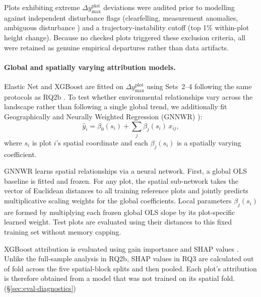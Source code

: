 \documentclass[11pt,a4paper]{report}
\begin{document}
Plots exhibiting extreme $\Delta y_{\max}^{\text{plot}}$ deviations were audited prior to modelling against independent disturbance flags (clearfelling, measurement anomalies, ambiguous disturbance ) and a trajectory-instability cutoff (top 1\% within-plot height change). Because no checked plots triggered these exclusion criteria, all were retained as genuine empirical departures rather than data artifacts.

\paragraph*{Global and spatially varying attribution models.}
Elastic Net and XGBoost are fitted on $\Delta y_{\max}^{\text{plot}}$ using Sets~2--4 following the same protocols as RQ2b \cite{zou2005Regularization_C4_NN, chen2016XGBoost_C4_NN}. To test whether environmental relationships vary across the landscape rather than following a single global trend, we additionally fit Geographically and Neurally Weighted Regression (GNNWR) \cite{du2020Geographically_C6_GWR}):
\begin{equation}
\hat{y}_i = \beta_0(s_i) + \sum_j \beta_j(s_i)\,x_{ij},
\label{eq:gnnwr}
\end{equation}
where $s_i$ is plot $i$'s spatial coordinate and each $\beta_j(s_i)$ is a spatially varying coefficient. 

GNNWR learns spatial relationships via a neural network. First, a global OLS baseline is fitted and frozen. For any plot, the spatial sub-network takes the vector of Euclidean distances to all training reference plots and jointly predicts multiplicative scaling weights for the global coefficients. Local parameters $\beta_j(s_i)$ are formed by multiplying each frozen global OLS slope by its plot-specific learned weight. Test plots are evaluated using their distances to this fixed training set without memory capping. 

XGBoost attribution is evaluated using gain importance and SHAP values
\citep{lundberg2017}. Unlike the full-sample analysis in RQ2b, SHAP values in
RQ3 are calculated out of fold across the five spatial-block splits and then
pooled. Each plot's attribution is therefore obtained from a model that was
not trained on its spatial fold. (\S\ref{sec:eval-diagnostics})
\end{document}
